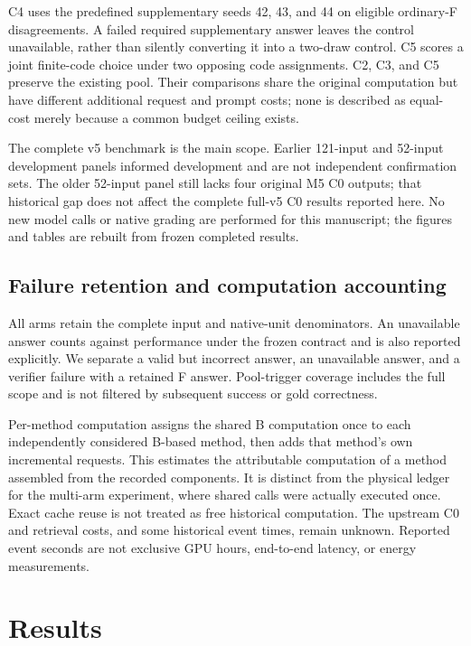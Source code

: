 \documentclass[
  english,
  11pt,
]{article}
\newcounter{none} %
\begin{document}
C4 uses the predefined supplementary seeds 42, 43, and 44 on eligible
ordinary-F disagreements. A failed required supplementary answer leaves
the control unavailable, rather than silently converting it into a
two-draw control. C5 scores a joint finite-code choice under two
opposing code assignments. C2, C3, and C5 preserve the existing pool.
Their comparisons share the original computation but have different
additional request and prompt costs; none is described as equal-cost
merely because a common budget ceiling exists.

The complete v5 benchmark is the main scope. Earlier 121-input and
52-input development panels informed development and are not independent
confirmation sets. The older 52-input panel still lacks four original M5
C0 outputs; that historical gap does not affect the complete full-v5 C0
results reported here. No new model calls or native grading are
performed for this manuscript; the figures and tables are rebuilt from
frozen completed results.

\subsection{Failure retention and computation
accounting}\label{failure-retention-and-computation-accounting}

All arms retain the complete input and native-unit denominators. An
unavailable answer counts against performance under the frozen contract
and is also reported explicitly. We separate a valid but incorrect
answer, an unavailable answer, and a verifier failure with a retained F
answer. Pool-trigger coverage includes the full scope and is not
filtered by subsequent success or gold correctness.

Per-method computation assigns the shared B computation once to each
independently considered B-based method, then adds that method's own
incremental requests. This estimates the attributable computation of a
method assembled from the recorded components. It is distinct from the
physical ledger for the multi-arm experiment, where shared calls were
actually executed once. Exact cache reuse is not treated as free
historical computation. The upstream C0 and retrieval costs, and some
historical event times, remain unknown. Reported event seconds are not
exclusive GPU hours, end-to-end latency, or energy measurements.

\section{Results}\label{results}
\end{document}
